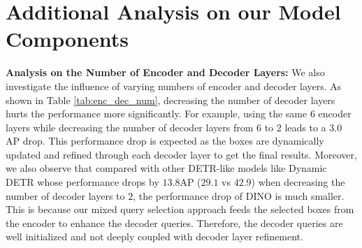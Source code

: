 \documentclass[runningheads]{llncs}
\begin{document}
 \section{Additional Analysis on our Model Components}\label{sec:num_layer}
\begin{table}[h]
\centering
    \centering
    \vspace{0.3cm}
    \caption{Ablation on the numbers of encoder layers and decoder layers with the ResNet-50 backbone on COCO \texttt{val2017}. We use the $12$-epoch setting and $100$ DN queries without negative samples here.
    }
    \label{tab:enc_dec_num}
\end{table} \noindent
\textbf{Analysis on the Number of Encoder and Decoder Layers: }We also investigate the influence of varying numbers of encoder and decoder layers. As shown in Table \ref{tab:enc_dec_num}, decreasing the number of decoder layers hurts the performance more significantly. For example, using the same $6$ encoder layers while decreasing the number of decoder layers from $6$ to $2$ leads to a $3.0$ AP drop. This performance drop is expected as the boxes are dynamically updated and refined through each decoder layer to get the final results. Moreover, we also observe that compared with other DETR-like models like Dynamic DETR \cite{dai2021dynamic} whose performance drops by $13.8$AP ($29.1$ vs $42.9$) when decreasing the number of decoder layers to $2$, the performance drop of DINO is much smaller. This is because our mixed query selection approach feeds the selected boxes from the encoder to enhance the decoder queries. Therefore, the decoder queries are well initialized and not deeply coupled with decoder layer refinement. 
\begin{table}[h]
\centering
    \centering
    \vspace{0.3cm}
    \caption{Ablation on number of denoising queries with the ResNet-50 backbone on COCO validation. Note that $100$ CND query pairs contains $200$ queries which are $100$ positive and $100$ negative queries.
    }
    \label{tab:dn_num}
\end{table} \\
\end{document}
